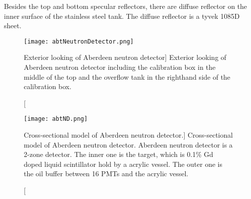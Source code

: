 Besides the top and bottom specular reflectors, there are diffuse reflector on the inner surface of the stainless steel tank.
The diffuse reflector is a tyvek 1085D sheet.\cite{tyvek}

%




\begin{figure}
    \centering
    \texttt{[image: abtNeutronDetector.png]}
    \caption
    [Exterior looking of Aberdeen neutron detector]
    {Exterior looking of Aberdeen neutron detector including the calibration box in the middle of the top and the overflow tank in the righthand side of the calibration box.}
    \label{fig:abtNeutronDetector}
    \end{figure}

\begin{figure}
    \centering
    \texttt{[image: abtND.png]}
    \caption
    [Cross-sectional model of Aberdeen neutron detector.]
    {
Cross-sectional model of Aberdeen neutron detector.
Aberdeen neutron detector is a 2-zone detector. The inner one is the target, which is
0.1\% Gd doped liquid scintillator hold by a acrylic vessel.
The outer one is the oil buffer between 16 PMTs and the acrylic vessel.}
    \label{fig:abtND}
    \end{figure}




